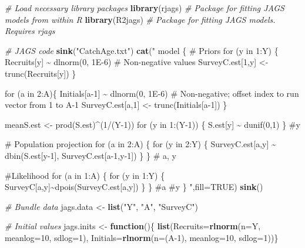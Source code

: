 \documentclass[
]{krantz}
\makeatletter
\newenvironment{Shaded}{\begin{snugshade}}{\end{snugshade}}
\newcommand{\AttributeTok}[1]{\textcolor[rgb]{0.27,0.27,0.27}{#1}}
\newcommand{\CommentTok}[1]{\textcolor[rgb]{0.37,0.37,0.37}{\textit{#1}}}
\newcommand{\ConstantTok}[1]{\textcolor[rgb]{0.37,0.37,0.37}{#1}}
\newcommand{\ControlFlowTok}[1]{\textcolor[rgb]{0.27,0.27,0.27}{\textbf{#1}}}
\newcommand{\DecValTok}[1]{\textcolor[rgb]{0.06,0.06,0.06}{#1}}
\newcommand{\FunctionTok}[1]{\textcolor[rgb]{0.27,0.27,0.27}{\textbf{#1}}}
\newcommand{\NormalTok}[1]{#1}
\newcommand{\OtherTok}[1]{\textcolor[rgb]{0.37,0.37,0.37}{#1}}
\newcommand{\StringTok}[1]{\textcolor[rgb]{0.5,0.5,0.5}{#1}}
\newenvironment{kframe}{%
\medskip{}
\setlength{\fboxsep}{.8em}
 \def\at@end@of@kframe{}%
 \ifinner\ifhmode%
  \def\at@end@of@kframe{\end{minipage}}%
  \begin{minipage}{\columnwidth}%
 \fi\fi%
 \def\FrameCommand##1{\hskip\@totalleftmargin \hskip-\fboxsep
 \colorbox{shadecolor}{##1}\hskip-\fboxsep
     \hskip-\linewidth \hskip-\@totalleftmargin \hskip\columnwidth}%
 \MakeFramed {\advance\hsize-\width
   \@totalleftmargin\z@ \linewidth\hsize
   \@setminipage}}%
 {\par\unskip\endMakeFramed%
 \at@end@of@kframe}
\renewenvironment{Shaded}{\begin{kframe}}{\end{kframe}}
\makeatother
\begin{document}
\begin{Shaded}
\begin{Highlighting}[]
\CommentTok{\# Load necessary library packages}
\FunctionTok{library}\NormalTok{(rjags)   }\CommentTok{\# Package for fitting JAGS models from within R}
\FunctionTok{library}\NormalTok{(R2jags)  }\CommentTok{\# Package for fitting JAGS models. Requires rjags}

\CommentTok{\# JAGS code}
\FunctionTok{sink}\NormalTok{(}\StringTok{"CatchAge.txt"}\NormalTok{)}
\FunctionTok{cat}\NormalTok{(}\StringTok{"}
\StringTok{model \{}
\StringTok{    \# Priors}
\StringTok{    for (y in 1:Y) \{}
\StringTok{      Recruits[y] \textasciitilde{} dlnorm(0, 1E{-}6) \# Non{-}negative values}
\StringTok{    SurveyC.est[1,y] \textless{}{-} trunc(Recruits[y]) \}}

\StringTok{    for (a in 2:A)\{}
\StringTok{      Initials[a{-}1] \textasciitilde{} dlnorm(0, 1E{-}6) }
\StringTok{      \# Non{-}negative; offset index to run vector from 1 to A{-}1}
\StringTok{    SurveyC.est[a,1] \textless{}{-} trunc(Initials[a{-}1]) \}}

\StringTok{  meanS.est \textless{}{-} prod(S.est)\^{}(1/(Y{-}1))}
\StringTok{  for (y in 1:(Y{-}1)) \{}
\StringTok{    S.est[y] \textasciitilde{} dunif(0,1)}
\StringTok{    \} \#y}

\StringTok{    \# Population projection}
\StringTok{    for (a in 2:A) \{}
\StringTok{   for (y in 2:Y) \{}
\StringTok{     SurveyC.est[a,y] \textasciitilde{} dbin(S.est[y{-}1], SurveyC.est[a{-}1,y{-}1]) }
\StringTok{     \} \} \# a, y}

\StringTok{    \#Likelihood}
\StringTok{    for (a in 1:A) \{}
\StringTok{   for (y in 1:Y) \{}
\StringTok{      SurveyC[a,y]\textasciitilde{}dpois(SurveyC.est[a,y])}
\StringTok{     \} \} \#a \#y}
\StringTok{\}}
\StringTok{    "}\NormalTok{,}\AttributeTok{fill=}\ConstantTok{TRUE}\NormalTok{)}
\FunctionTok{sink}\NormalTok{()}

\CommentTok{\# Bundle data}
\NormalTok{jags.data }\OtherTok{\textless{}{-}} \FunctionTok{list}\NormalTok{(}\StringTok{"Y"}\NormalTok{, }\StringTok{"A"}\NormalTok{, }\StringTok{"SurveyC"}\NormalTok{)}

\CommentTok{\# Initial values}
\NormalTok{jags.inits }\OtherTok{\textless{}{-}} \ControlFlowTok{function}\NormalTok{()\{ }\FunctionTok{list}\NormalTok{(}\AttributeTok{Recruits=}\FunctionTok{rlnorm}\NormalTok{(}\AttributeTok{n=}\NormalTok{Y, }
                                               \AttributeTok{meanlog=}\DecValTok{10}\NormalTok{, }\AttributeTok{sdlog=}\DecValTok{1}\NormalTok{),}
                               \AttributeTok{Initials=}\FunctionTok{rlnorm}\NormalTok{(}\AttributeTok{n=}\NormalTok{(A}\DecValTok{{-}1}\NormalTok{), }
                                               \AttributeTok{meanlog=}\DecValTok{10}\NormalTok{, }\AttributeTok{sdlog=}\DecValTok{1}\NormalTok{))\}}


\end{Highlighting}
\end{Shaded}
\end{document}
